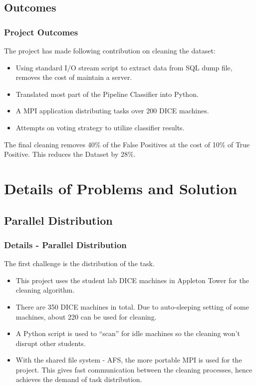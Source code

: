 \documentclass{beamer}[fullspacing]
\begin{document}
\subsection{Outcomes}

\begin{frame}
\frametitle{Project Outcomes}

The project has made following contribution on cleaning the dataset:
\begin{itemize}
\item
Using standard I/O stream script to extract data from SQL dump file, removes the cost of maintain a server.
\item
Translated most part of the Pipeline Classifier into Python.
\item
A MPI application distributing tasks over 200 DICE machines.
\item
Attempts on voting strategy to utilize classifier results.
\end{itemize}
\vspace{10pt}
The final cleaning removes 40\% of the False Positives at the cost of 10\% of True Positive. This reduces the Dataset by 28\%.

\end{frame}



\section{Details of Problems and Solution}
\subsection{Parallel Distribution}

\begin{frame}
\frametitle{Details - Parallel Distribution}

The first challenge is the distribution of the task.
\begin{itemize}
\item
This project uses the student lab DICE machines in Appleton Tower for the cleaning algorithm.
\item
There are 350 DICE machines in total. Due to auto-sleeping setting of some machines, about 220 can be used for cleaning.
\item
A Python script is used to ``scan'' for idle machines so the cleaning won't disrupt other students.
\item
With the shared file system - AFS, the more portable MPI is used for the project. This gives fast communication between the cleaning processes, hence achieves the demand of task distribution.
\end{itemize}

\end{frame}
\end{document}
